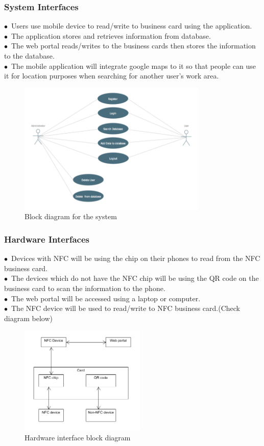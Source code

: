 \documentclass[english]{article}
\begin{document}
		\subsubsection{System Interfaces}


$\bullet$\ Users use mobile device to read/write to business card using the application.
\\$\bullet$\ The application stores and retrieves information from database.
\\$\bullet$\ The web portal reads/writes to the business cards then stores the information to the database.
\\$\bullet$\ The mobile application will integrate google maps to it so that people can use it for location purposes when searching for another user’s work area.

\begin{figure}[ht!]
\centering
\includegraphics[width=90mm]{system.png}
\caption{Block diagram for the system }
\end{figure}	
						

					\subsubsection{Hardware Interfaces}				
$\bullet$\ Devices with NFC will be using the chip on their phones to read from the NFC business card. \\$\bullet$\
The devices which do not have the NFC chip will be using the QR code on the business card to scan the information to the phone.\\$\bullet$\
The web portal will be accessed using a laptop or computer.\\$\bullet$\
The NFC device will be used to read/write to NFC business card.(Check diagram below)\\
\begin{figure}[ht!]
\centering
\includegraphics[width=60mm]{Hardware.png}
\caption{Hardware interface block diagram }
\end{figure}
\end{document}

